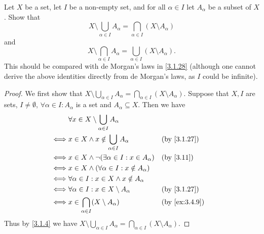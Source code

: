 \begin{ex}\label{ex:3.4.11}
  Let \(X\) be a set, let \(I\) be a non-empty set, and for all \(\alpha \in I\) let \(A_{\alpha}\) be a subset of \(X\).
  Show that
  \[
    X \setminus \bigcup_{\alpha \in I} A_{\alpha} = \bigcap_{\alpha \in I} (X \setminus A_{\alpha})
  \]
  and
  \[
    X \setminus \bigcap_{\alpha \in I} A_{\alpha} = \bigcup_{\alpha \in I} (X \setminus A_{\alpha}).
  \]
  This should be compared with de Morgan's laws in \cref{3.1.28}
  (although one cannot derive the above identities directly from de Morgan's laws, as \(I\) could be infinite).
\end{ex}

\begin{proof}
  We first show that \(X \setminus \bigcup_{\alpha \in I} A_{\alpha} = \bigcap_{\alpha \in I} (X \setminus A_{\alpha})\).
  Suppose that \(X, I\) are sets, \(I \neq \emptyset\), \(\forall \alpha \in I : A_{\alpha}\) is a set and \(A_{\alpha} \subseteq X\).
  Then we have
  \begin{align*}
         & \forall x \in X \setminus \bigcup_{\alpha \in I} A_{\alpha}                     \\
    \iff & x \in X \land x \notin \bigcup_{\alpha \in I} A_{\alpha}     &  & \by{3.1.27}   \\
    \iff & x \in X \land \lnot(\exists \alpha \in I : x \in A_{\alpha}) &  & \by{3.11}     \\
    \iff & x \in X \land (\forall \alpha \in I : x \notin A_{\alpha})                      \\
    \iff & \forall \alpha \in I : x \in X \land x \notin A_{\alpha}                        \\
    \iff & \forall \alpha \in I : x \in X \setminus A_{\alpha}          &  & \by{3.1.27}   \\
    \iff & x \in \bigcap_{\alpha \in I} (X \setminus A_{\alpha})        &  & \by{ex:3.4.9} \\
  \end{align*}
  Thus by \cref{3.1.4} we have \(X \setminus \bigcup_{\alpha \in I} A_{\alpha} = \bigcap_{\alpha \in I} (X \setminus A_{\alpha})\).


\end{proof}
